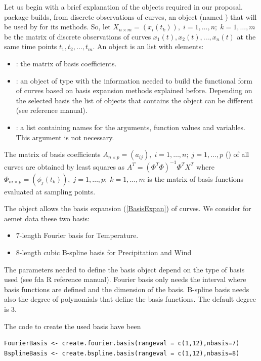 Let us begin with a brief explanation of the  objects required in our proposal.  package builds, from discrete observations of curves, an  object (named ) that will be used by  for its methods. So, let $X_{n\times m}=(x_i(t_k)),\; i=1,\ldots,n;\; k=1,\ldots,m$ be the matrix of discrete observations of curves $x_{1}\left( t\right) ,x_{2}\left( t\right) ,\ldots ,x_{n}\left( t\right) $ at the same time points $t_{1},t_{2},\ldots ,t_{m}$. An  object is an  list with elements:
\begin{itemize}
\item {}: the matrix of basis coefficients.
\item {}: an object of type  with the information needed to build the functional form of curves based on basis expansion methods explained before. Depending on the selected basis the list of objects that contains the  object can be different (see  reference manual).
\item {}: a list containing names for the arguments, function values and variables. This argument is not necessary.
\end{itemize}
The matrix of basis coefficients $A_{n \times p}=(a_{ij}), \; i=1,\ldots,n;\; j=1,\ldots,p$ () of all curves are obtained by least squares as $A^{T}=\left( \Phi ^{T}\Phi \right) ^{-1}\Phi ^{T}X^{T}$
where  $\Phi_{m \times p} = (\phi _{j}\left( t_{k}\right)),\; j=1,\ldots,p; \; k=1,\ldots,m$ is the matrix of basis functions evaluated at sampling points.

The  object allows the basis expansion (\ref{BasisExpan}) of curves. We consider for aemet data these two basis:
\begin{itemize}
 \item $7$-length Fourier basis for Temperature.
 \item $8$-length cubic B-spline basis for Precipitation and Wind
\end{itemize}
The  parameters needed to define the basis object depend on the type of basis used (see fda R reference manual). Fourier basis only needs the interval where basis functions are defined and the dimension of the basis. B-spline basis needs also the degree of polynomials that define the basis functions. The default degree is 3.

The code to create the used basis have been

\begin{verbatim}
FourierBasis <- create.fourier.basis(rangeval = c(1,12),nbasis=7)
BsplineBasis <- create.bspline.basis(rangeval = c(1,12),nbasis=8)
\end{verbatim}

